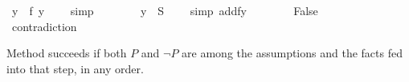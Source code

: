 \begin{isabellebody}
\ {\isachardoublequoteopen}y\ {\isasymin}\ f\ y{\isachardoublequoteclose}\ \ \ \isamarkupfalse%
\ simp\isanewline
\ \ \ \ \ \ \isamarkupfalse%
\ {\isachardoublequoteopen}y\ {\isasymin}\ {\isacharquery}S{\isachardoublequoteclose}\ \ \ \ \isamarkupfalse%
{\isacharparenleft}simp\ add{\isacharcolon}fy{\isacharparenright}\isanewline
\ \ \ \ \ \ \isamarkupfalse%
\ False\ \ \ \ \ \ \ \ \ \isamarkupfalse%
\ contradiction\isanewline
\ \ \ \ \isamarkupfalse%
\isanewline
\ \ \isamarkupfalse%
\isanewline
{}\isamarkupfalse%
%
\endisatagproof
{\isafoldproof}%
%
\isadelimproof
%
\endisadelimproof
%
\begin{isamarkuptext}%
\noindent Method  succeeds if both $P$ and
$\neg P$ are among the assumptions and the facts fed into that step, in any order.


\end{isamarkuptext}
\end{isabellebody}
